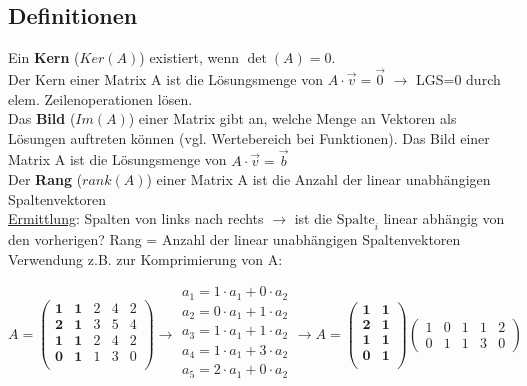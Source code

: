 \subsection{Definitionen}

Ein \textbf{Kern} (\(Ker(A)\)) existiert, wenn \(\det(A) = 0\).\\
Der Kern einer Matrix A ist die Lösungsmenge von \(A \cdot \vec{v} = \vec{0}\) \(\rightarrow\) LGS=0 durch elem. Zeilenoperationen lösen.\\

Das \textbf{Bild} (\(Im(A)\)) einer Matrix gibt an, welche Menge an Vektoren als Lösungen auftreten können (vgl. Wertebereich bei Funktionen). Das Bild einer Matrix A ist die Lösungsmenge von \(A \cdot \vec{v} = \vec{b}\)\\


Der \textbf{Rang} (\(rank(A)\)) einer Matrix A ist die Anzahl der linear unabhängigen Spaltenvektoren\\
\underline{Ermittlung}: Spalten von links nach rechts \(\rightarrow\) ist die \(\text{Spalte}_i\) linear abhängig von den vorherigen? Rang = Anzahl der linear unabhängigen Spaltenvektoren\\
Verwendung z.B. zur Komprimierung von A:

\begin{equation*}
    A = \begin{pmatrix}
        \textbf{1} & \textbf{1} & 2 & 4 & 2\\
        \textbf{2} & \textbf{1} & 3 & 5 & 4\\
        \textbf{1} & \textbf{1} & 2 & 4 & 2\\
        \textbf{0} & \textbf{1} & 1 & 3 & 0\\        
    \end{pmatrix} \rightarrow \begin{array}{c}
        a_1 = 1 \cdot a_1 + 0 \cdot a_2\\
        a_2 = 0 \cdot a_1 + 1 \cdot a_2\\
        a_3 = 1 \cdot a_1 + 1 \cdot a_2\\
        a_4 = 1 \cdot a_1 + 3 \cdot a_2\\
        a_5 = 2 \cdot a_1 + 0 \cdot a_2\\
    \end{array} \rightarrow A = \begin{pmatrix}
        \textbf{1} & \textbf{1} \\
        \textbf{2} & \textbf{1} \\
        \textbf{1} & \textbf{1} \\
        \textbf{0} & \textbf{1} \\
    \end{pmatrix} \begin{pmatrix}
        1 & 0 & 1 & 1 & 2\\
        0 & 1 & 1 & 3 & 0
    \end{pmatrix}
\end{equation*}\\

